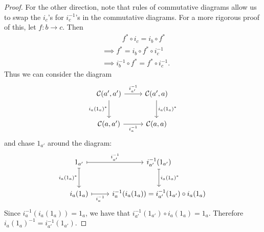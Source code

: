 \begin{proof}
	For the other direction, note that rules of commutative diagrams allow us to swap the $i_c$'s for $i_c^{-1} $'s in the commutative diagrams. For a more rigorous proof of this, let $f : b \to c$. Then
	\begin{align*}
		&\qquad\;\;\; f^*\circ i_c = i_b\circ f^*\\
		&\implies f^* = i_b \circ f^* \circ i_c^{-1} \\
		&\implies i_b^{-1} \circ f^* = f^* \circ i_c^{-1} 
	.\end{align*}
	Thus we can consider the diagram
	\[\begin{tikzcd}[row sep = 2.5em, column sep = 2.5em]
		\mathcal{C} (a',a')\ar[" i_{a'} ^{-1}  ", r] \ar[" i_a(1_a)^* "', d]  & \mathcal{C} (a',a)\ar[" i_a(1_a)^* ", d]  \\
	\mathcal{C} (a,a')\ar[" i_a ^{-1}  "', r]  & \mathcal{C} (a,a)
	\end{tikzcd}\]
	and chase $1_{a'} $ around the diagram:
	\[\begin{tikzcd}[row sep = 2.5em, column sep = 2.5em]
		1_{a'}\ar[" i_{a'} ^{-1}  ", mapsto, r] \ar[" i_a(1_a)^* "', mapsto, d]  & i_{a'} ^{-1} (1_{a'} )\ar[" i_a(1_a)^* ", mapsto, d]  \\
	i_a(1_a)\ar[" i_a ^{-1}  "', mapsto, r]  & i_a^{-1} (i_a(1_a)) = i_{a'} ^{-1} (1_{a'} )\circ i_a(1_a)
	\end{tikzcd}\]
	Since $i_a^{-1} (i_a(1_a)) = 1_a$, we have that $i_{a'} ^{-1} (1_{a'})\circ i_a(1_a) = 1_a$. Therefore $i_a(1_a)^{-1} =i_{a'} ^{-1} (1_{a'} )$.
\end{proof}

